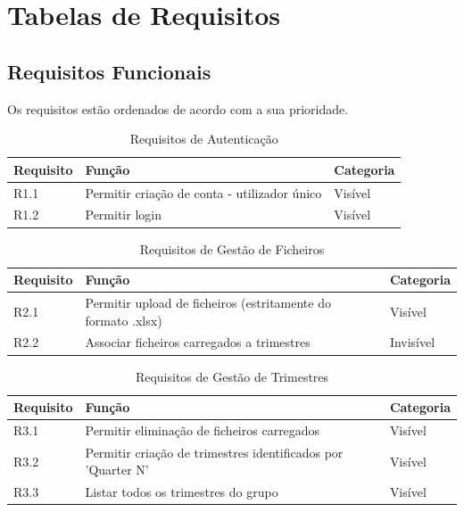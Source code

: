 \chapter{Tabelas de Requisitos}
\label{ch:tabRequisitos}

\section{Requisitos Funcionais}
Os requisitos estão ordenados de acordo com a sua prioridade.

\begin{table}[h!]
\centering
\begin{tabular}{|l|p{7cm}|l|}
\hline
\textbf{Requisito} & \textbf{Função} & \textbf{Categoria} \\
\hline
R1.1 & Permitir criação de conta - utilizador único & Visível \\
R1.2 & Permitir login & Visível \\
\hline
\end{tabular}
\caption{Requisitos de Autenticação}
\label{tab:requisitosAutenticacao}
\end{table}

\begin{table}[h!]
\centering
\begin{tabular}{|l|p{7cm}|l|}
\hline
\textbf{Requisito} & \textbf{Função} & \textbf{Categoria} \\
\hline
R2.1 & Permitir upload de ficheiros (estritamente do formato .xlsx) & Visível \\
R2.2 & Associar ficheiros carregados a trimestres & Invisível \\
\hline
\end{tabular}
\caption{Requisitos de Gestão de Ficheiros}
\label{tab:requisitosFicheiros}
\end{table}

\begin{table}[h!]
\centering
\begin{tabular}{|l|p{7cm}|l|}
\hline
\textbf{Requisito} & \textbf{Função} & \textbf{Categoria} \\
\hline
R3.1 & Permitir eliminação de ficheiros carregados & Visível \\
R3.2 & Permitir criação de trimestres identificados por 'Quarter N' & Visível \\
R3.3 & Listar todos os trimestres do grupo & Visível \\
\hline
\end{tabular}
\caption{Requisitos de Gestão de Trimestres}
\label{tab:requisitosTrimestres}
\end{table}

